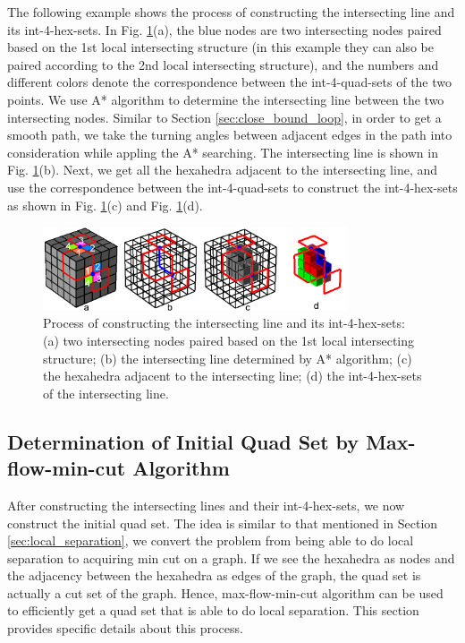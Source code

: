 \documentclass[final,5p,times,twocolumn]{elsarticle}
\begin{document}
The following example shows the process of constructing the intersecting line and its int-4-hex-sets. In Fig. \ref{fig:det_int_line}(a), the blue nodes are two intersecting nodes paired based on the 1st local intersecting structure (in this example they can also be paired according to the 2nd local intersecting structure), and the numbers and different colors denote the correspondence between the int-4-quad-sets of the two points. We use A* algorithm to determine the intersecting line between the two intersecting nodes. Similar to Section \ref{sec:close_bound_loop}, in order to get a smooth path, we take the turning angles between adjacent edges in the path into consideration while appling the A* searching. The intersecting line is shown in Fig. \ref{fig:det_int_line}(b). Next, we get all the hexahedra adjacent to the intersecting line, and use the correspondence between the int-4-quad-sets to construct the int-4-hex-sets as shown in Fig. \ref{fig:det_int_line}(c) and Fig. \ref{fig:det_int_line}(d).

\begin{figure}[htbp]
\begin{center}
\includegraphics[width=9cm]{figures/det_int_line.png}
\caption{Process of constructing the intersecting line and its int-4-hex-sets: (a) two intersecting nodes paired based on the 1st local intersecting structure; (b) the intersecting line determined by A* algorithm; (c) the hexahedra adjacent to the intersecting line; (d) the int-4-hex-sets of the intersecting line.}
\label{fig:det_int_line}
\end{center}
\end{figure}

\subsection{Determination of Initial Quad Set by Max-flow-min-cut Algorithm}
\label{sec:det_init_quad_set}
After constructing the intersecting lines and their int-4-hex-sets, we now construct the initial quad set. The idea is similar to that mentioned in Section \ref{sec:local_separation}, we convert the problem from being able to do local separation to acquiring min cut on a graph. If we see the hexahedra as nodes and the adjacency between the hexahedra as edges of the graph, the quad set is actually a cut set of the graph. Hence, max-flow-min-cut algorithm can be used to efficiently get a quad set that is able to do local separation. This section provides specific details about this process.
\end{document}
